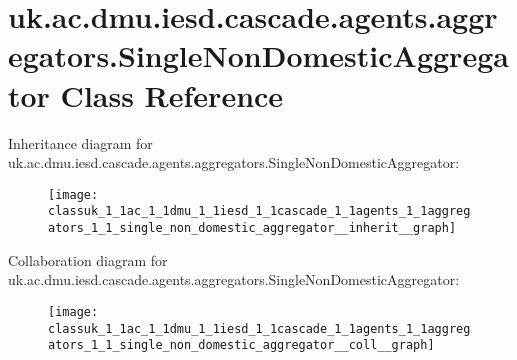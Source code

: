 \hypertarget{classuk_1_1ac_1_1dmu_1_1iesd_1_1cascade_1_1agents_1_1aggregators_1_1_single_non_domestic_aggregator}{\section{uk.\-ac.\-dmu.\-iesd.\-cascade.\-agents.\-aggregators.\-Single\-Non\-Domestic\-Aggregator Class Reference}
\label{classuk_1_1ac_1_1dmu_1_1iesd_1_1cascade_1_1agents_1_1aggregators_1_1_single_non_domestic_aggregator}
}


Inheritance diagram for uk.\-ac.\-dmu.\-iesd.\-cascade.\-agents.\-aggregators.\-Single\-Non\-Domestic\-Aggregator\-:\nopagebreak
\begin{figure}[H]
\begin{center}
\leavevmode
\texttt{[image: classuk\_1\_1ac\_1\_1dmu\_1\_1iesd\_1\_1cascade\_1\_1agents\_1\_1aggregators\_1\_1\_single\_non\_domestic\_aggregator\_\_inherit\_\_graph]}
\end{center}
\end{figure}


Collaboration diagram for uk.\-ac.\-dmu.\-iesd.\-cascade.\-agents.\-aggregators.\-Single\-Non\-Domestic\-Aggregator\-:\nopagebreak
\begin{figure}[H]
\begin{center}
\leavevmode
\texttt{[image: classuk\_1\_1ac\_1\_1dmu\_1\_1iesd\_1\_1cascade\_1\_1agents\_1\_1aggregators\_1\_1\_single\_non\_domestic\_aggregator\_\_coll\_\_graph]}
\end{center}
\end{figure}
